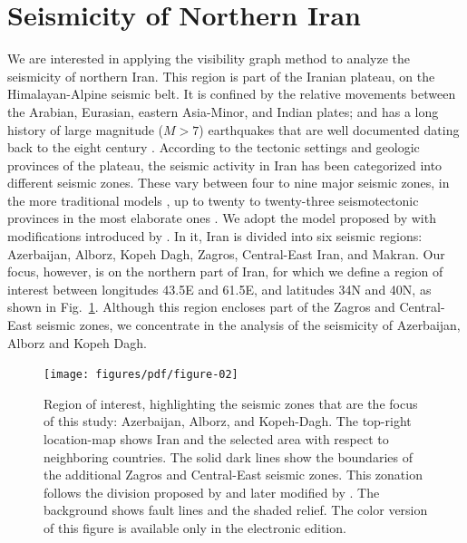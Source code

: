 
\section{Seismicity of Northern Iran}

We are interested in applying the visibility graph method to analyze the seismicity of northern Iran. This region is part of the Iranian plateau, on the Himalayan-Alpine seismic belt. It is confined by the relative movements between the Arabian, Eurasian, eastern Asia-Minor, and Indian plates; and has a long history of large magnitude ($M>7$) earthquakes that are well documented dating back to the eight century \citep[e.g.,][]{Berberian_1981_Chap}. According to the tectonic settings and geologic provinces of the plateau, the seismic activity in Iran has been categorized into different seismic zones. These vary between four to nine major seismic zones, in the more traditional models \citep[e.g.,][]{Stocklin1968, Takin1972, Berberian1976}, up to twenty to twenty-three seismotectonic provinces in the most elaborate ones \citep[e.g.,][]{Nowroozi1976, Tavakoli1999}. We adopt the model proposed by \citet{Mirzaei1998} with modifications introduced by \citet{Karimiparidari2013}. In it, Iran is divided into six seismic regions: Azerbaijan, Alborz, Kopeh Dagh, Zagros, Central-East Iran, and Makran. Our focus, however, is on the northern part of Iran, for which we define a region of interest between longitudes 43.5\textdegree{}E and 61.5\textdegree{}E, and latitudes 34\textdegree{}N and 40\textdegree{}N, as shown in Fig.~\ref{fig:study_region}. Although this region encloses part of the Zagros and Central-East seismic zones, we concentrate in the analysis of the seismicity of Azerbaijan, Alborz and Kopeh Dagh.

\begin{figure}[t]
	\centering
	\texttt{[image: figures/pdf/figure-02]} 
	\caption{Region of interest, highlighting the seismic zones that are the focus of this study: Azerbaijan, Alborz, and Kopeh-Dagh. The top-right location-map shows Iran and the selected area with respect to neighboring countries. The solid dark lines show the boundaries of the additional Zagros and Central-East seismic zones. This zonation follows the division proposed by \citet{Mirzaei1998} and later modified by \citet{Karimiparidari2013}. The background shows fault lines and the shaded relief. The color version of this figure is available only in the electronic edition.}
	\label{fig:study_region}
\end{figure}

